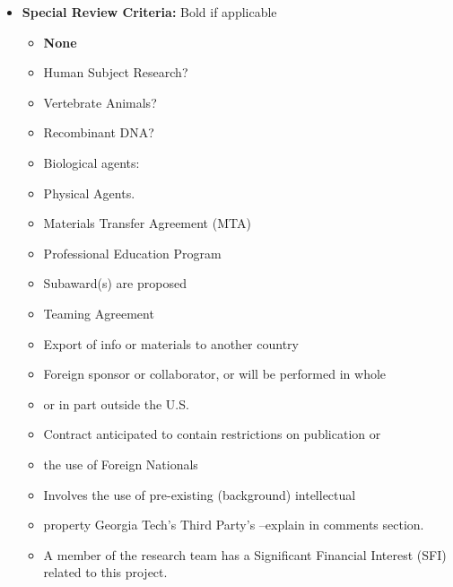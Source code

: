 \begin{itemize}
\item \textbf{Special Review Criteria:} Bold if applicable
\begin{itemize}
\item \textbf{None}
\item Human Subject Research?
\item Vertebrate Animals? 
\item Recombinant DNA?
\item Biological agents:
\item Physical Agents. 
\item Materials Transfer Agreement (MTA)
\item Professional Education Program 
\item Subaward(s) are proposed
\item Teaming Agreement
\item Export of info or materials to another country
\item Foreign sponsor or collaborator, or will be performed in whole \item or in part outside the U.S.
\item Contract anticipated to contain restrictions on publication or \item the use of Foreign Nationals
\item Involves the use of pre-existing (background) intellectual \item property Georgia Tech’s Third Party’s –explain in comments section.
\item A member of the research team has a Significant Financial Interest (SFI) related to this project. 
\end{itemize}
\end{itemize}
